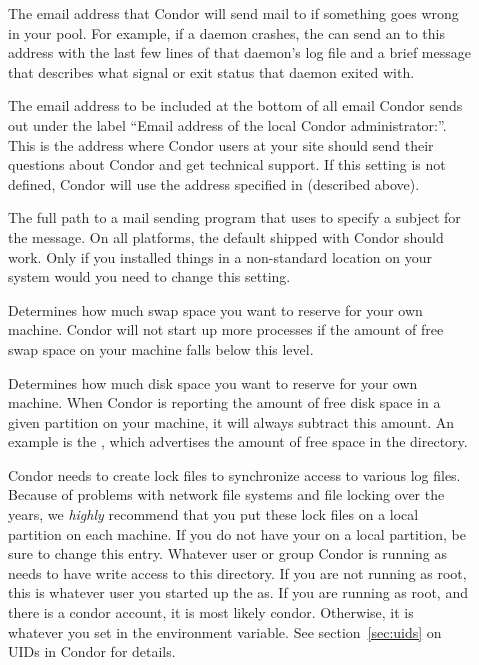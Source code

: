 \begin{description}
\item[] \label{param:CondorAdmin} The email
  address that Condor will send mail to if something goes wrong in
  your pool.  For example, if a daemon crashes, the 
  can send an  to this address with the last few lines
  of that daemon's log file and a brief message that describes what
  signal or exit status that daemon exited with.
  
\item[] \label{param:CondorSupportEmail}
  The email address to be included at the bottom of all email Condor
  sends out under the label ``Email address of the local Condor
  administrator:''.  
  This is the address where Condor users at your site should send
  their questions about Condor and get technical support.
  If this setting is not defined, Condor will use the address
  specified in  (described above).

\item[] \label{param:Mail} The full path to a mail
  sending program that uses  to
  specify a subject for the message.  On all platforms,
  the default shipped with Condor should work.  Only if you
  installed things in a non-standard location on your system would you
  need to change this setting.
  
\item[] \label{param:ReservedSwap} Determines
  how much swap space you want to reserve for your own
  machine.  Condor will not start up more  processes if
  the amount of free swap space on your machine falls below this
  level. 

\item[] \label{param:ReservedDisk} Determines
  how much disk space you want to reserve for your own
  machine.  When Condor is reporting the amount of free disk space in
  a given partition on your machine, it will always subtract this
  amount.  An example is the , which
  advertises the amount of
  free space in the  directory.
  
\item[] \label{param:Lock} Condor needs to create
  lock files to synchronize access to various log files.  Because of
  problems with network file systems and file locking over
  the years, we \emph{highly} recommend that you put these lock
  files on a local partition on each machine.  If you do not have your
   on a local partition, be sure to change this
  entry.  Whatever user or group Condor is running as needs to have
  write access to this directory.  If you are not running as root, this
  is whatever user you started up the  as.  If you are
  running as root, and there is a condor account, it is most
  likely condor.
  Otherwise, it is whatever you set in the 
  environment variable.  See section~\ref{sec:uids} on UIDs in
  Condor for details.


\end{description}
